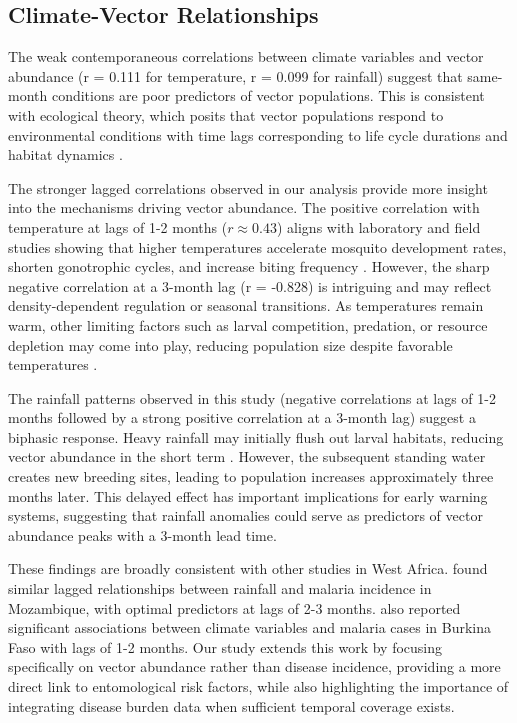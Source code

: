 \documentclass{article}
\begin{document}
\subsection{Climate-Vector Relationships}
\par
The weak contemporaneous correlations between climate variables and vector abundance (r = 0.111 for temperature, 
r = 0.099 for rainfall) suggest that same-month conditions are poor predictors of vector populations. This is consistent 
with ecological theory, which posits that vector populations respond to environmental conditions with time lags 
corresponding to life cycle durations and habitat dynamics \citep{2010.WJ.CIP}.
\par
The stronger lagged correlations observed in our analysis provide more insight into the mechanisms driving vector 
abundance. The positive correlation with temperature at lags of 1-2 months ($r \approx 0.43$) aligns with laboratory 
and field studies showing that higher temperatures accelerate mosquito development rates, shorten gonotrophic cycles, 
and increase biting frequency \citep{2025.CG.EOT, 1966.MA.FRL}. However, the sharp negative correlation at a 3-month 
lag (r = -0.828) is intriguing and may reflect density-dependent regulation or seasonal transitions. As temperatures 
remain warm, other limiting factors such as larval competition, predation, or resource depletion may come into play, 
reducing population size despite favorable temperatures \citep{2020.SF.BLF}.
\par
The rainfall patterns observed in this study (negative correlations at lags of 1-2 months followed by a strong positive 
correlation at a 3-month lag) suggest a biphasic response. Heavy rainfall may initially flush out larval habitats, 
reducing vector abundance in the short term \citep{2015.MA.SHH}. However, the subsequent standing water creates new 
breeding sites, leading to population increases approximately three months later. This delayed effect has important 
implications for early warning systems, suggesting that rainfall anomalies could serve as predictors of vector abundance 
peaks with a 3-month lead time.
\par
These findings are broadly consistent with other studies in West Africa. \citet{2025.CJ.SMA} found similar lagged 
relationships between rainfall and malaria incidence in Mozambique, with optimal predictors at lags of 2-3 months. 
\citet{2021.CS.SAA} also reported significant associations between climate variables and malaria cases in Burkina 
Faso with lags of 1-2 months. Our study extends this work by focusing specifically on vector abundance rather than 
disease incidence, providing a more direct link to entomological risk factors, while also highlighting the importance 
of integrating disease burden data when sufficient temporal coverage exists.
\end{document}
